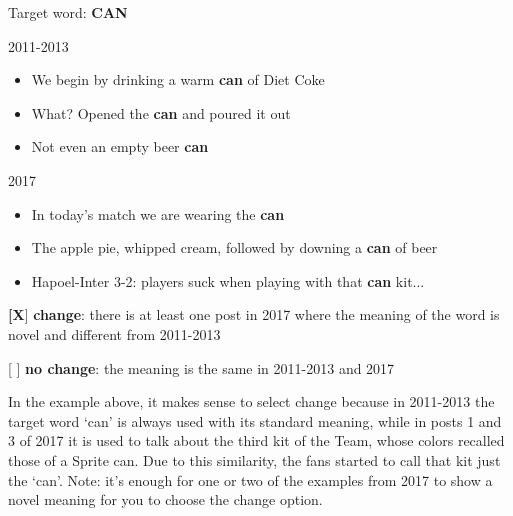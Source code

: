 \documentclass[11pt,a4paper]{article}
\begin{document}
\begin{minipage}{15cm}
Target word: \textbf{CAN}

\vspace*{0.25cm}
2011-2013
\begin{itemize}
\item We begin by drinking a warm \textbf{can} of Diet Coke
\item What? Opened the \textbf{can} and poured it out
\item Not even an empty beer \textbf{can}
\end{itemize}

\vspace*{0.25cm}

2017
\begin{itemize}
\item In today's match we are wearing the \textbf{can}
\item The apple pie, whipped cream, followed by downing a \textbf{can} of beer
\item Hapoel-Inter 3-2: players suck when playing with that \textbf{can} kit...
\end{itemize}

\vspace*{0.25cm}

\textbf{[X}] \textbf{change}: there is at least one post in 2017 where the meaning of the word is novel and different from 2011-2013

[  ] \textbf{no change}: the meaning is the same in 2011-2013 and 2017

\vspace*{0.25cm}

In the example above, it makes sense to select change because in 2011-2013 the target word `can' is always used with its standard meaning, while in posts 1 and 3 of  2017 it is used to talk about the third kit of the Team, whose colors recalled those of a Sprite can. Due to this similarity, the fans started to call that kit just the `can'. 
Note: it's enough for one or two of the examples from 2017 to show a novel meaning for you to choose the change option.

\end{minipage}

\pagebreak

\clearpage

\end{document}
